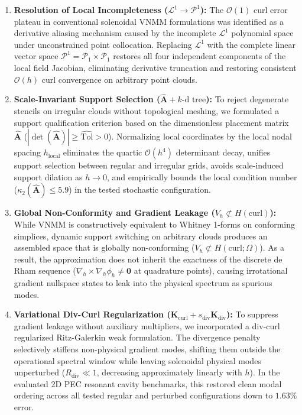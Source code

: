 \documentclass[preprint,12pt]{elsarticle}
\begin{document}
\begin{enumerate}
    \item \textbf{Resolution of Local Incompleteness ($\mathcal{L}^1 \to \mathcal{P}^1$):} 
    The $\mathcal{O}(1)$ curl error plateau in conventional solenoidal VNMM formulations was identified as a derivative aliasing mechanism caused by the incomplete $\mathcal{L}^1$ polynomial space under unconstrained point collocation. Replacing $\mathcal{L}^1$ with the complete linear vector space $\mathcal{P}^1 = \mathcal{P}_1 \times \mathcal{P}_1$ restores all four independent components of the local field Jacobian, eliminating derivative truncation and restoring consistent $\mathcal{O}(h)$ curl convergence on arbitrary point clouds.

    \item \textbf{Scale-Invariant Support Selection ($\widehat{\mathbf{A}} + \text{$k$-d tree}$):} 
    To reject degenerate stencils on irregular clouds without topological meshing, we formulated a support qualification criterion based on the dimensionless placement matrix $\widehat{\mathbf{A}}$ ($|\det(\widehat{\mathbf{A}})| \ge \widehat{\mathrm{Tol}} > 0$). Normalizing local coordinates by the local nodal spacing $h_{\mathrm{local}}$ eliminates the quartic $\mathcal{O}(h^4)$ determinant decay, unifies support selection between regular and irregular grids, avoids scale-induced support dilation as $h \to 0$, and empirically bounds the local condition number ($\kappa_2(\widehat{\mathbf{A}}) \le 5.9$) in the tested stochastic configuration.

    \item \textbf{Global Non-Conformity and Gradient Leakage ($V_h \not\subset H(\mathrm{curl})$):} 
    While VNMM is constructively equivalent to Whitney 1-forms on conforming simplices, dynamic support switching on arbitrary clouds produces an assembled space that is globally non-conforming ($V_h \not\subset H(\mathrm{curl}; \Omega)$). As a result, the approximation does not inherit the exactness of the discrete de Rham sequence ($\nabla_h \times \nabla_h \phi_h \neq \mathbf{0}$ at quadrature points), causing irrotational gradient nullspace states to leak into the physical spectrum as spurious modes.

    \item \textbf{Variational Div-Curl Regularization ($\mathbf{K}_{\mathrm{curl}} + s_{\mathrm{div}} \mathbf{K}_{\mathrm{div}}$):} 
    To suppress gradient leakage without auxiliary multipliers, we incorporated a div-curl regularized Ritz-Galerkin weak formulation. The divergence penalty selectively stiffens non-physical gradient modes, shifting them outside the operational spectral window while leaving solenoidal physical modes unperturbed ($R_{\mathrm{div}} \ll 1$, decreasing approximately linearly with $h$). In the evaluated 2D PEC resonant cavity benchmarks, this restored clean modal ordering across all tested regular and perturbed configurations down to $1.63\%$ error.


\end{enumerate}
\end{document}
